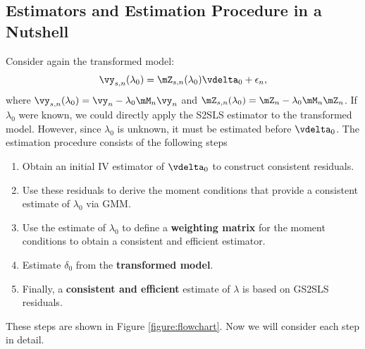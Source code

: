 \documentclass[english,12pt]{book}\usepackage[]{graphicx}\usepackage[]{xcolor}
\begin{document}
\subsection{Estimators and Estimation Procedure in a Nutshell}

Consider again the transformed model:
\begin{equation*}
  \vy_{s,n}(\lambda_0) = \mZ_{s,n}(\lambda_0)\vdelta_0 + \epsilon_n, 
\end{equation*}
%
where $\vy_{s,n}(\lambda_0) = \vy_n - \lambda_0\mM_n\vy_n$ and $\mZ_{s,n}(\lambda_0) = \mZ_n - \lambda_0\mM_n\mZ_n$. If $\lambda_0$ were known, we could directly apply the S2SLS estimator to the transformed model. However,  since $\lambda_0$ is unknown, it must be estimated before $\vdelta_0$. The estimation procedure consists of the following steps

\begin{enumerate}
  \item Obtain an initial IV estimator of $\vdelta_0$ to construct consistent residuals.
  \item Use these residuals to derive the moment conditions that provide a consistent estimate  of $\lambda_0$ via GMM.
  \item Use the estimate of $\lambda_0$ to define a \textbf{weighting matrix} for the moment conditions to obtain a consistent and efficient estimator. 
  \item Estimate $\delta_0$ from the \textbf{transformed model}.
  \item Finally, a \textbf{consistent and efficient} estimate of $\lambda$ is based on GS2SLS residuals. 
\end{enumerate}

These steps are shown in Figure \ref{figure:flowchart}. Now we will consider each step in detail.
\end{document}
